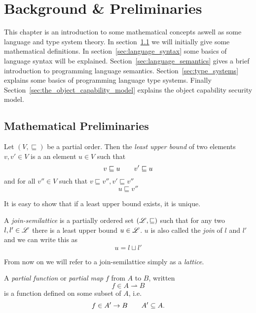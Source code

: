 \chapter{Background \& Preliminaries} \label{cha:background}

This chapter is an introduction to some mathematical concepts aswell as some
language and type system theory.  In section~\ref{sec:mathematical_definitions}
we will initially give some mathematical definitions. In
section~\ref{sec:language_syntax} some basics of language syntax will be
explained. Section~\ref{sec:language_semantics} gives a brief introduction to
programming language semantics. Section~\ref{sec:type_systems} explains
some basics of programming language type systems. Finally
Section~\ref{sec:the_object_capability_model} explains the object capability
security model.

\section{Mathematical Preliminaries}
\label{sec:mathematical_definitions}

\begin{definition}
  Let $(V, \sqsubseteq)$ be a partial order. Then the \emph{least upper bound}
  of two elements $v, v' \in V$ is a an element $u \in V$ such that
  \begin{equation*}
    v \sqsubseteq u \quad\quad v' \sqsubseteq u
  \end{equation*}
  and for all $v'' \in V$ such that $v \sqsubseteq v'', v' \sqsubseteq v''$
  \begin{equation*}
    u \sqsubseteq v''
  \end{equation*}
\end{definition}
It is easy to show that if a least upper bound exists, it is unique.
\begin{definition}
  A \emph{join-semilattice} is a partially ordered set $(\mbox{$\mathscr{L}$}, \sqsubseteq)$ such
  that for any two $l, l' \in \mbox{$\mathscr{L}$}$ there is a least upper bound $u \in
  \mbox{$\mathscr{L}$}$. $u$ is also called the \emph{join} of $l$ and $l'$ and we can write
  this as
  \begin{equation*}
    u = l \sqcup l'
  \end{equation*}
\end{definition}
From now on we will refer to a join-semilattice simply as a \emph{lattice}.
\begin{definition}
  A \emph{partial function} or \emph{partial map} $f$ from $A$ to $B$, written
  \begin{equation*}
    f\in A \rightharpoonup B
  \end{equation*}
  is a function defined on some subset of $A$, i.e.
  \begin{equation*}
    f \in A' \to B \quad\quad A' \subseteq A.
  \end{equation*}
\end{definition}

